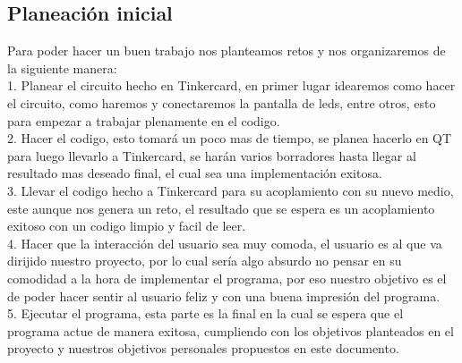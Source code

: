 \documentclass{article}
\begin{document}
\subsection{Planeación inicial}
Para poder hacer un buen trabajo nos planteamos retos y nos organizaremos de la siguiente manera:\\
1. Planear el circuito hecho en Tinkercard, en primer lugar idearemos como hacer el circuito, como haremos y conectaremos la pantalla de leds, entre otros, esto para empezar a trabajar plenamente en el codigo.\\
2. Hacer el codigo, esto tomará un poco mas de tiempo, se planea hacerlo en QT para luego llevarlo a Tinkercard, se harán varios borradores hasta llegar al resultado mas deseado final, el cual sea una implementación exitosa.\\
3. Llevar el codigo hecho a Tinkercard para su acoplamiento con su nuevo medio, este aunque nos genera un reto, el resultado que se espera es un acoplamiento exitoso con un codigo limpio y facil de leer.\\
4. Hacer que la interacción del usuario sea muy comoda, el usuario es al que va dirijido nuestro proyecto, por lo cual sería algo absurdo no pensar en su comodidad a la hora de implementar el programa, por eso nuestro objetivo es el de poder hacer sentir al usuario feliz y con una buena impresión del programa.\\
5. Ejecutar el programa, esta parte es la final en la cual se espera que el programa actue de manera exitosa, cumpliendo con los objetivos planteados en el proyecto y nuestros objetivos personales propuestos en este documento.\\
\end{document}
